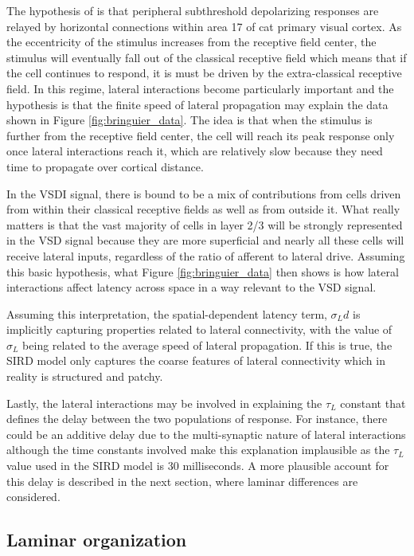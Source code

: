 \documentclass[phd,ianc,twoside]{infthesis}
\begin{document}
The hypothesis of \citet{bringuier_science99} is that peripheral
subthreshold depolarizing responses are relayed by horizontal
connections within area 17 of cat primary visual cortex. As the
eccentricity of the stimulus increases from the receptive field center,
the stimulus will eventually fall out of the classical receptive field
which means that if the cell continues to respond, it is must be driven
by the extra-classical receptive field. In this regime, lateral
interactions become particularly important and the hypothesis is that
the finite speed of lateral propagation may explain the data shown in
Figure \ref{fig:bringuier_data}. The idea is that when the stimulus is
further from the receptive field center, the cell will reach its peak
response only once lateral interactions reach it, which are relatively
slow because they need time to propagate over cortical distance.

In the VSDI signal, there is bound to be a mix of contributions from
cells driven from within their classical receptive fields as well as
from outside it. What really matters is that the vast majority of cells
in layer 2/3 will be strongly represented in the VSD signal because they
are more superficial and nearly all these cells will receive lateral
inputs, regardless of the ratio of afferent to lateral drive. Assuming
this basic hypothesis, what Figure \ref{fig:bringuier_data} then shows
is how lateral interactions affect latency across space in a way
relevant to the VSD signal.

Assuming this interpretation, the spatial-dependent latency term,
$\sigma_L d$ is implicitly capturing properties related to lateral
connectivity, with the value of $\sigma_L$ being related to the average
speed of lateral propagation. If this is true, the SIRD model only
captures the coarse features of lateral connectivity which in reality is
structured and patchy.

Lastly, the lateral interactions may be involved in explaining the
$\tau_L$ constant that defines the delay between the two populations of
response. For instance, there could be an additive delay due to the
multi-synaptic nature of lateral interactions although the time
constants involved make this explanation implausible as the $\tau_L$
value used in the SIRD model is $30$ milliseconds. A more plausible
account for this delay is described in the next section, where laminar
differences are considered.

\subsection{Laminar organization}
\label{section:laminar_organization}
\end{document}
